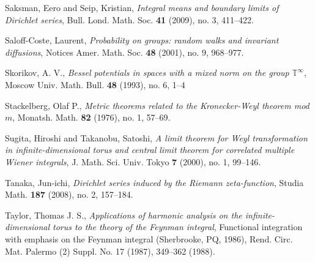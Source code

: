 \documentclass{article}
\begin{document}
Saksman, Eero and Seip, Kristian, {\em Integral means and boundary limits of Dirichlet series},
Bull. Lond. Math. Soc. \textbf{41} (2009), no. 3, 411--422. 

Saloff-Coste, Laurent, {\em Probability on groups: random walks and invariant diffusions}, 
Notices Amer. Math. Soc. \textbf{48} (2001), no. 9, 968--977. 

Skorikov, A. V., {\em Bessel potentials in spaces with a mixed norm on the group $\mathbb{T}^\infty$},
Moscow Univ. Math. Bull. \textbf{48} (1993), no. 6, 1--4 

Stackelberg, Olaf P., {\em Metric theorems related to the Kronecker-Weyl theorem mod $m$}, 
Monatsh. Math. \textbf{82} (1976), no. 1, 57--69. 

Sugita, Hiroshi and Takanobu, Satoshi,
{\em A limit theorem for Weyl transformation in infinite-dimensional torus and central limit theorem for correlated multiple Wiener integrals},
J. Math. Sci. Univ. Tokyo \textbf{7} (2000), no. 1, 99--146. 

Tanaka, Jun-ichi, {\em Dirichlet series induced by the Riemann zeta-function}, Studia Math. \textbf{187} (2008), no. 2, 157--184. 

Taylor, Thomas J. S., {\em Applications of harmonic analysis on the infinite-dimensional torus to the theory of the Feynman integral},
Functional integration with emphasis on the Feynman integral (Sherbrooke, PQ, 1986),
Rend. Circ. Mat. Palermo (2) Suppl. No. 17 (1987), 349--362 (1988). 
\end{document}
